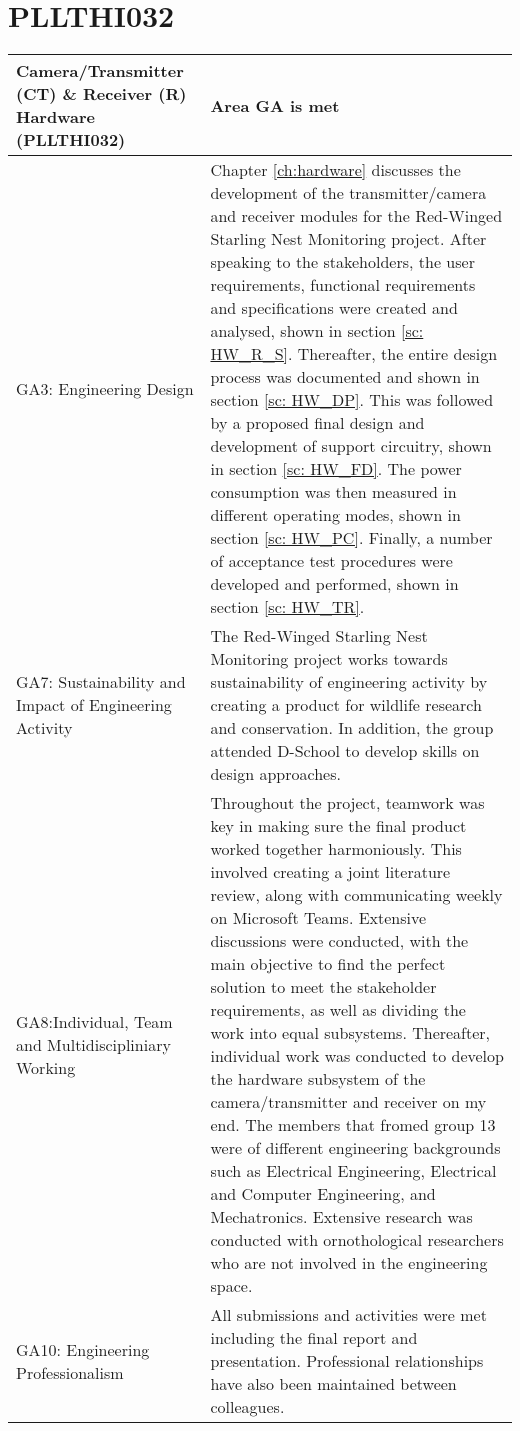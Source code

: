 \documentclass[class=report,11pt,crop=false]{standalone}
\begin{document}
\raggedright







\section{PLLTHI032}

\centering
\begin{tabularx}{\textwidth}{|p{} X|}

    \hline
    \textbf{Camera/Transmitter (CT) \& Receiver (R) Hardware (PLLTHI032)}  & \textbf{Area GA is met} \\ \hline

    GA3: Engineering Design & Chapter \ref{ch:hardware} discusses the development of the transmitter/camera and receiver modules for the Red-Winged Starling Nest Monitoring project. After speaking to the stakeholders, the user requirements, functional requirements and specifications were created and analysed, shown in section \ref{sc: HW_R_S}. Thereafter, the entire design process was documented and shown in section \ref{sc: HW_DP}. This was followed by a proposed final design and development of support circuitry, shown in section \ref{sc: HW_FD}. The power consumption was then measured in different operating modes, shown in section \ref{sc: HW_PC}. Finally, a number of acceptance test procedures were developed and performed, shown in section \ref{sc: HW_TR}. \\ \hline

    GA7: Sustainability and Impact of Engineering Activity & The Red-Winged Starling Nest Monitoring project works towards sustainability of engineering activity by creating a product for wildlife research and conservation.  In addition, the group attended D-School to develop skills on design approaches. \\ \hline

    GA8:Individual, Team and Multidiscipliniary Working & Throughout the project, teamwork was key in making sure the final product worked together harmoniously. This involved creating a joint literature review, along with communicating weekly on Microsoft Teams. Extensive discussions were conducted, with the main objective to find the perfect solution to meet the stakeholder requirements, as well as dividing the work into equal subsystems. Thereafter, individual work was conducted to develop the hardware subsystem of the camera/transmitter and receiver on my end. The members that fromed group 13 were of different engineering backgrounds such as Electrical Engineering, Electrical and Computer Engineering, and Mechatronics. Extensive research was conducted with ornothological researchers who are not involved in the engineering space. \\ \hline

    GA10: Engineering Professionalism & All submissions and activities were met including the final report and presentation. Professional relationships have also been maintained between colleagues. \\ \hline


\end{tabularx}
\raggedright
\end{document}
